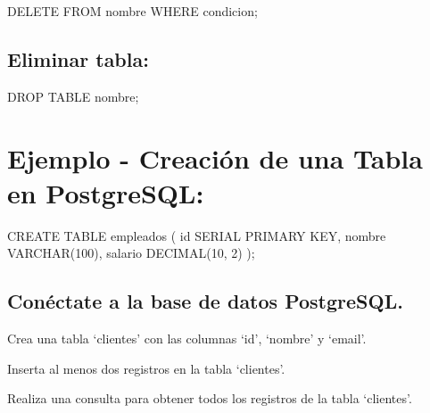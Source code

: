 \documentclass[
  a4paper,
  onepage,
  openany]{scrreprt}
\newenvironment{Shaded}{\begin{snugshade}}{\end{snugshade}}
\newcommand{\DataTypeTok}[1]{\textcolor[rgb]{0.68,0.00,0.00}{#1}}
\newcommand{\DecValTok}[1]{\textcolor[rgb]{0.68,0.00,0.00}{#1}}
\newcommand{\KeywordTok}[1]{\textcolor[rgb]{0.00,0.23,0.31}{#1}}
\newcommand{\NormalTok}[1]{\textcolor[rgb]{0.00,0.23,0.31}{#1}}
\begin{document}
\begin{Shaded}
\begin{Highlighting}[]
\KeywordTok{DELETE} \KeywordTok{FROM}\NormalTok{ nombre }\KeywordTok{WHERE}\NormalTok{ condicion;}
\end{Highlighting}
\end{Shaded}

\hypertarget{eliminar-tabla-2}{%
\subsection{Eliminar tabla:}\label{eliminar-tabla-2}}

\begin{Shaded}
\begin{Highlighting}[]
\KeywordTok{DROP} \KeywordTok{TABLE}\NormalTok{ nombre;}
\end{Highlighting}
\end{Shaded}

\hypertarget{ejemplo---creaciuxf3n-de-una-tabla-en-postgresql-2}{%
\section{Ejemplo - Creación de una Tabla en
PostgreSQL:}\label{ejemplo---creaciuxf3n-de-una-tabla-en-postgresql-2}}

\begin{Shaded}
\begin{Highlighting}[]
\KeywordTok{CREATE} \KeywordTok{TABLE}\NormalTok{ empleados (}
    \KeywordTok{id}\NormalTok{ SERIAL }\KeywordTok{PRIMARY} \KeywordTok{KEY}\NormalTok{,}
\NormalTok{    nombre }\DataTypeTok{VARCHAR}\NormalTok{(}\DecValTok{100}\NormalTok{),}
\NormalTok{    salario }\DataTypeTok{DECIMAL}\NormalTok{(}\DecValTok{10}\NormalTok{, }\DecValTok{2}\NormalTok{)}
\NormalTok{);}
\end{Highlighting}
\end{Shaded}

\begin{tcolorbox}[enhanced jigsaw, breakable, opacityback=0, toptitle=1mm, coltitle=black, toprule=.15mm, rightrule=.15mm, colframe=quarto-callout-important-color-frame, opacitybacktitle=0.6, arc=.35mm, title=\textcolor{quarto-callout-important-color}{\faExclamation}\hspace{0.5em}{Actividad Práctica}, titlerule=0mm, colbacktitle=quarto-callout-important-color!10!white, bottomtitle=1mm, bottomrule=.15mm, colback=white, left=2mm, leftrule=.75mm]

\hypertarget{conuxe9ctate-a-la-base-de-datos-postgresql.}{%
\section{Conéctate a la base de datos
PostgreSQL.}\label{conuxe9ctate-a-la-base-de-datos-postgresql.}}

Crea una tabla `clientes' con las columnas `id', `nombre' y `email'.

Inserta al menos dos registros en la tabla `clientes'.

Realiza una consulta para obtener todos los registros de la tabla
`clientes'.

\end{tcolorbox}
\end{document}
